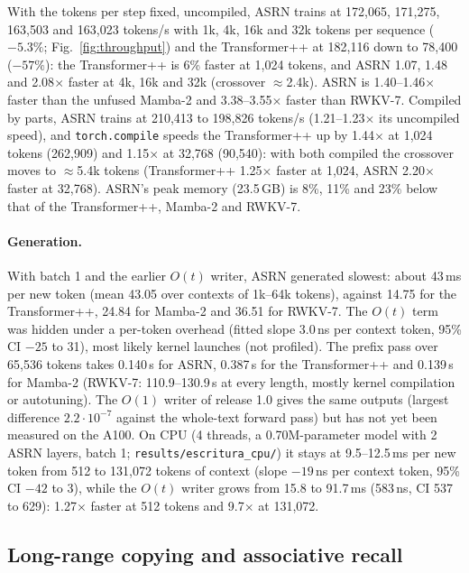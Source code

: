 \documentclass[11pt]{article}
\begin{document}
With the tokens per step fixed, uncompiled, ASRN trains at 172{,}065, 171{,}275, 163{,}503 and 163{,}023 tokens/s with
1k, 4k, 16k and 32k tokens per sequence ($-5.3\%$; Fig.~\ref{fig:throughput}) and the Transformer++ at 182{,}116 down to
78{,}400 ($-57\%$): the Transformer++ is 6\% faster at 1{,}024 tokens, and ASRN 1.07, 1.48 and 2.08$\times$ faster at
4k, 16k and 32k (crossover $\approx$2.4k). ASRN is 1.40--1.46$\times$ faster than the unfused Mamba-2 and
3.38--3.55$\times$ faster than RWKV-7. Compiled by parts, ASRN trains at 210{,}413 to 198{,}826 tokens/s
(1.21--1.23$\times$ its uncompiled speed), and \texttt{torch.compile} speeds the Transformer++ up by 1.44$\times$ at
1{,}024 tokens (262{,}909) and 1.15$\times$ at 32{,}768 (90{,}540): with both compiled the crossover moves to
$\approx$5.4k tokens (Transformer++ 1.25$\times$ faster at 1{,}024, ASRN 2.20$\times$ faster at 32{,}768). ASRN's peak
memory (23.5\,GB) is 8\%, 11\% and 23\% below that of the Transformer++, Mamba-2 and RWKV-7.

\paragraph{Generation.} With batch 1 and the earlier $O(t)$ writer, ASRN generated slowest: about 43\,ms per new token
(mean 43.05 over contexts of 1k--64k tokens), against 14.75 for the Transformer++, 24.84 for Mamba-2 and 36.51 for
RWKV-7. The $O(t)$ term was hidden under a per-token overhead (fitted slope 3.0\,ns per context token, 95\% CI $-25$ to
31), most likely kernel launches (not profiled). The prefix pass over 65{,}536 tokens takes 0.140\,s for ASRN, 0.387\,s
for the Transformer++ and 0.139\,s for Mamba-2 (RWKV-7: 110.9--130.9\,s at every length, mostly kernel compilation or
autotuning). The $O(1)$ writer of release 1.0 gives the same outputs (largest difference $2.2\cdot10^{-7}$ against the
whole-text forward pass) but has not yet been measured on the A100. On CPU (4 threads, a 0.70M-parameter model with 2
ASRN layers, batch 1; \nolinkurl{results/escritura_cpu/}) it stays at 9.5--12.5\,ms per new token from 512 to 131{,}072
tokens of context (slope $-19$\,ns per context token, 95\% CI $-42$ to 3), while the $O(t)$ writer grows from 15.8 to
91.7\,ms (583\,ns, CI 537 to 629): 1.27$\times$ faster at 512 tokens and 9.7$\times$ at 131{,}072.

\subsection{Long-range copying and associative recall}
\label{sec:copy}
\end{document}
